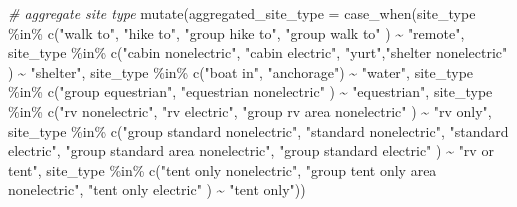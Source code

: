 \documentclass[
]{book}
\newenvironment{Shaded}{\begin{snugshade}}{\end{snugshade}}
\newcommand{\AttributeTok}[1]{\textcolor[rgb]{0.77,0.63,0.00}{#1}}
\newcommand{\CommentTok}[1]{\textcolor[rgb]{0.56,0.35,0.01}{\textit{#1}}}
\newcommand{\FunctionTok}[1]{\textcolor[rgb]{0.00,0.00,0.00}{#1}}
\newcommand{\NormalTok}[1]{#1}
\newcommand{\SpecialCharTok}[1]{\textcolor[rgb]{0.00,0.00,0.00}{#1}}
\newcommand{\StringTok}[1]{\textcolor[rgb]{0.31,0.60,0.02}{#1}}
\begin{document}
\begin{Shaded}
\begin{Highlighting}[]
\CommentTok{\# aggregate site type}
\FunctionTok{mutate}\NormalTok{(}\AttributeTok{aggregated\_site\_type =} 
         \FunctionTok{case\_when}\NormalTok{(site\_type }\SpecialCharTok{\%in\%} \FunctionTok{c}\NormalTok{(}\StringTok{"walk to"}\NormalTok{, }\StringTok{"hike to"}\NormalTok{, }
                                    \StringTok{"group hike to"}\NormalTok{, }\StringTok{"group walk to"}
\NormalTok{         ) }\SpecialCharTok{\textasciitilde{}} \StringTok{"remote"}\NormalTok{,}
\NormalTok{         site\_type }\SpecialCharTok{\%in\%} \FunctionTok{c}\NormalTok{(}\StringTok{"cabin nonelectric"}\NormalTok{, }\StringTok{"cabin electric"}\NormalTok{, }
                          \StringTok{"yurt"}\NormalTok{,}\StringTok{"shelter nonelectric"}
\NormalTok{         ) }\SpecialCharTok{\textasciitilde{}} \StringTok{"shelter"}\NormalTok{,}
\NormalTok{         site\_type }\SpecialCharTok{\%in\%} \FunctionTok{c}\NormalTok{(}\StringTok{"boat in"}\NormalTok{, }\StringTok{"anchorage"}\NormalTok{) }\SpecialCharTok{\textasciitilde{}} \StringTok{"water"}\NormalTok{,}
\NormalTok{         site\_type }\SpecialCharTok{\%in\%} \FunctionTok{c}\NormalTok{(}\StringTok{"group equestrian"}\NormalTok{, }
                          \StringTok{"equestrian nonelectric"}
\NormalTok{         ) }\SpecialCharTok{\textasciitilde{}} \StringTok{"equestrian"}\NormalTok{,}
\NormalTok{         site\_type }\SpecialCharTok{\%in\%} \FunctionTok{c}\NormalTok{(}\StringTok{"rv nonelectric"}\NormalTok{, }\StringTok{"rv electric"}\NormalTok{, }
                          \StringTok{"group rv area nonelectric"}
\NormalTok{         ) }\SpecialCharTok{\textasciitilde{}} \StringTok{"rv only"}\NormalTok{,}
\NormalTok{         site\_type }\SpecialCharTok{\%in\%} \FunctionTok{c}\NormalTok{(}\StringTok{"group standard nonelectric"}\NormalTok{, }
                          \StringTok{"standard nonelectric"}\NormalTok{,}
                          \StringTok{"standard electric"}\NormalTok{, }
                          \StringTok{"group standard area nonelectric"}\NormalTok{,}
                          \StringTok{"group standard electric"}
\NormalTok{         ) }\SpecialCharTok{\textasciitilde{}} \StringTok{"rv or tent"}\NormalTok{,}
\NormalTok{         site\_type }\SpecialCharTok{\%in\%} \FunctionTok{c}\NormalTok{(}\StringTok{"tent only nonelectric"}\NormalTok{, }
                          \StringTok{"group tent only area nonelectric"}\NormalTok{,}
                          \StringTok{"tent only electric"}
\NormalTok{         ) }\SpecialCharTok{\textasciitilde{}} \StringTok{"tent only"}\NormalTok{))}
\end{Highlighting}
\end{Shaded}
\end{document}
